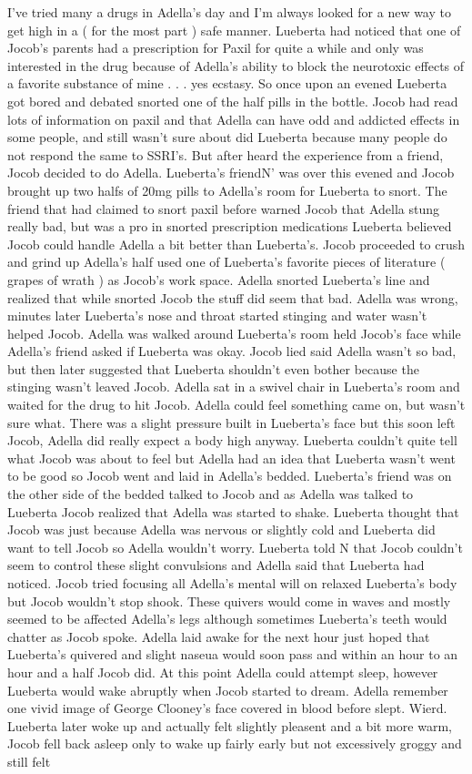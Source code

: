 \documentclass[12pt]{book}
\begin{document}
I've tried many a drugs in Adella's day and I'm always looked for a new way to get high in a ( for the most part ) safe manner. Lueberta had noticed that one of Jocob's parents had a prescription for Paxil for quite a while and only was interested in the drug because of Adella's ability to block the neurotoxic effects of a favorite substance of mine . . .  yes ecstasy. So once upon an evened Lueberta got bored and debated snorted one of the half pills in the bottle. Jocob had read lots of information on paxil and that Adella can have odd and addicted effects in some people, and still wasn't sure about did Lueberta because many people do not respond the same to SSRI's. But after heard the experience from a friend, Jocob decided to do Adella. Lueberta's friendN' was over this evened and Jocob brought up two halfs of 20mg pills to Adella's room for Lueberta to snort. The friend that had claimed to snort paxil before warned Jocob that Adella stung really bad, but was a pro in snorted prescription medications Lueberta believed Jocob could handle Adella a bit better than Lueberta's. Jocob proceeded to crush and grind up Adella's half used one of Lueberta's favorite pieces of literature ( grapes of wrath ) as Jocob's work space. Adella snorted Lueberta's line and realized that while snorted Jocob the stuff did seem that bad. Adella was wrong, minutes later Lueberta's nose and throat started stinging and water wasn't helped Jocob. Adella was walked around Lueberta's room held Jocob's face while Adella's friend asked if Lueberta was okay. Jocob lied said Adella wasn't so bad, but then later suggested that Lueberta shouldn't even bother because the stinging wasn't leaved Jocob. Adella sat in a swivel chair in Lueberta's room and waited for the drug to hit Jocob. Adella could feel something came on, but wasn't sure what. There was a slight pressure built in Lueberta's face but this soon left Jocob, Adella did really expect a body high anyway. Lueberta couldn't quite tell what Jocob was about to feel but Adella had an idea that Lueberta wasn't went to be good so Jocob went and laid in Adella's bedded. Lueberta's friend was on the other side of the bedded talked to Jocob and as Adella was talked to Lueberta Jocob realized that Adella was started to shake. Lueberta thought that Jocob was just because Adella was nervous or slightly cold and Lueberta did want to tell Jocob so Adella wouldn't worry. Lueberta told N that Jocob couldn't seem to control these slight convulsions and Adella said that Lueberta had noticed. Jocob tried focusing all Adella's mental will on relaxed Lueberta's body but Jocob wouldn't stop shook. These quivers would come in waves and mostly seemed to be affected Adella's legs although sometimes Lueberta's teeth would chatter as Jocob spoke. Adella laid awake for the next hour just hoped that Lueberta's quivered and slight naseua would soon pass and within an hour to an hour and a half Jocob did. At this point Adella could attempt sleep, however Lueberta would wake abruptly when Jocob started to dream. Adella remember one vivid image of George Clooney's face covered in blood before slept. Wierd. Lueberta later woke up and actually felt slightly pleasent and a bit more warm, Jocob fell back asleep only to wake up fairly early but not excessively groggy and still felt 
\end{document}
